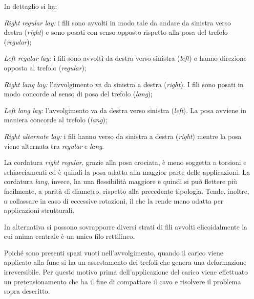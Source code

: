 In dettaglio si ha:
\begin{description}[font=\normalfont]
	\item[(a)] \emph{Right regular lay:} i fili sono avvolti in modo tale da andare da sinistra verso destra (\textit{right}) e sono posati con senso opposto rispetto alla posa del trefolo (\textit{regular});
	\item [(b)] \emph{Left regular lay:} i fili sono avvolti da destra verso sinistra (\textit{left}) e hanno direzione opposta al trefolo (\textit{regular});
	\item [(c)] \emph{Right lang lay:} l'avvolgimento va da sinistra a destra (\textit{right}). I fili sono posati in modo concorde al senso di posa del trefolo (\textit{lang});
	\item [(d)] \emph{Left lang lay:} l'avvolgimento va da destra verso sinistra (\textit{left}). La posa avviene in maniera concorde al trefolo (\textit{lang});
	\item[(e)] \emph{Right alternate lay:} i fili hanno verso da sinistra a destra (\textit{right}) mentre la posa viene alternata tra \textit{regular} e \textit{lang}.
\end{description}
La cordatura \textit{right regular}, grazie alla posa crociata, è meno soggetta a torsioni e schiacciamenti ed è quindi la posa adatta alla maggior parte delle applicazioni.
La cordatura \textit{lang}, invece, ha una flessibilità maggiore e quindi si può flettere più facilmente, a parità di diametro, rispetto alla precedente tipologia. Tende, inoltre, a collassare in caso di eccessive rotazioni, il che la rende meno adatta per applicazioni strutturali.

In alternativa si possono sovrapporre diversi strati di fili avvolti elicoidalmente la cui anima centrale è un unico filo rettilineo.

Poiché sono presenti spazi vuoti nell'avvolgimento, quando il carico viene applicato alla fune si ha un assestamento dei trefoli che genera una deformazione irreversibile. Per questo motivo prima dell'applicazione del carico viene effettuato un pretensionamento che ha il fine di compattare il cavo e risolvere il problema sopra descritto.





